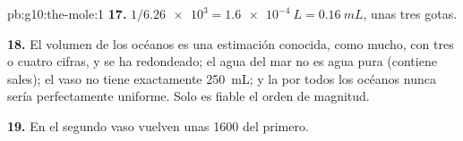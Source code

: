 \begin{solution}{pb:g10:the-mole:1}
\textbf{17.} $1 / \num{6.26e3} = \qty{1.6e-4}{L} = \qty{0.16}{mL}$,
unas tres gotas.

\textbf{18.} El volumen de los océanos es una estimación conocida, como
mucho, con tres o cuatro cifras, y se ha redondeado; el agua del mar no
es agua pura (contiene sales); el vaso no tiene exactamente
\qty{250}{mL}; y la  por todos los océanos nunca sería
perfectamente uniforme. Solo es fiable el orden de magnitud.

\textbf{19.} En el segundo vaso vuelven unas 1600  del primero.
\end{solution}
